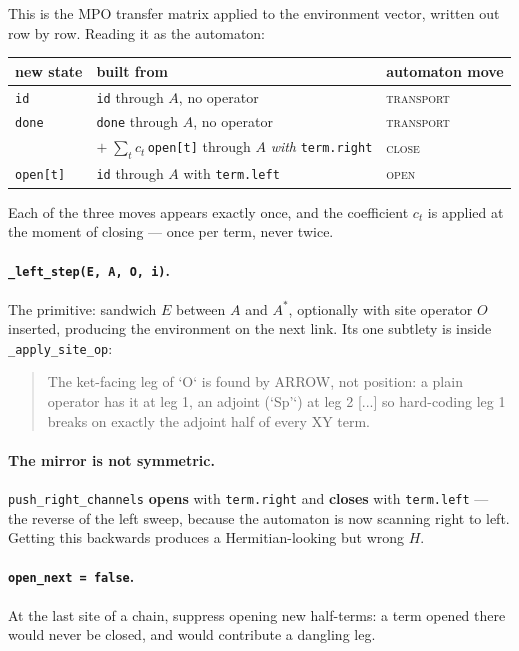 \documentclass[11pt,a4paper]{article}
\newcommand{\code}[1]{\texttt{\small #1}}
\begin{document}
This is the MPO transfer matrix applied to the environment vector, written out row by row.
Reading it as the automaton:

\begin{center}
\begin{tabular}{@{}lll@{}}
\toprule
\textbf{new state} & \textbf{built from} & \textbf{automaton move} \\
\midrule
\code{id} & \code{id} through $A$, no operator & \textsc{transport} \\
\code{done} & \code{done} through $A$, no operator & \textsc{transport} \\
          & $+\;\sum_t c_t\,$\code{open[t]} through $A$ \emph{with} \code{term.right} & \textsc{close} \\
\code{open[t]} & \code{id} through $A$ with \code{term.left} & \textsc{open} \\
\bottomrule
\end{tabular}
\end{center}

\noindent
Each of the three moves appears exactly once, and the coefficient $c_t$ is applied at the
moment of closing --- once per term, never twice.

\paragraph{\code{\_left\_step(E, A, O, i)}.} The primitive: sandwich $E$ between $A$ and $A^*$,
optionally with site operator $O$ inserted, producing the environment on the next link. Its
one subtlety is inside \code{\_apply\_site\_op}:
\begin{quote}\ttfamily\footnotesize
The ket-facing leg of `O` is found by ARROW, not position: a plain operator has it at leg 1,
an adjoint (`Sp'`) at leg 2 [...] so hard-coding leg 1 breaks on exactly the adjoint half of
every XY term.
\end{quote}

\paragraph{The mirror is not symmetric.} \code{push\_right\_channels} \textbf{opens} with
\code{term.right} and \textbf{closes} with \code{term.left} --- the reverse of the left sweep,
because the automaton is now scanning right to left. Getting this backwards produces a
Hermitian-looking but wrong $H$.

\paragraph{\code{open\_next = false}.} At the last site of a chain, suppress opening new
half-terms: a term opened there would never be closed, and would contribute a dangling leg.
\end{document}
